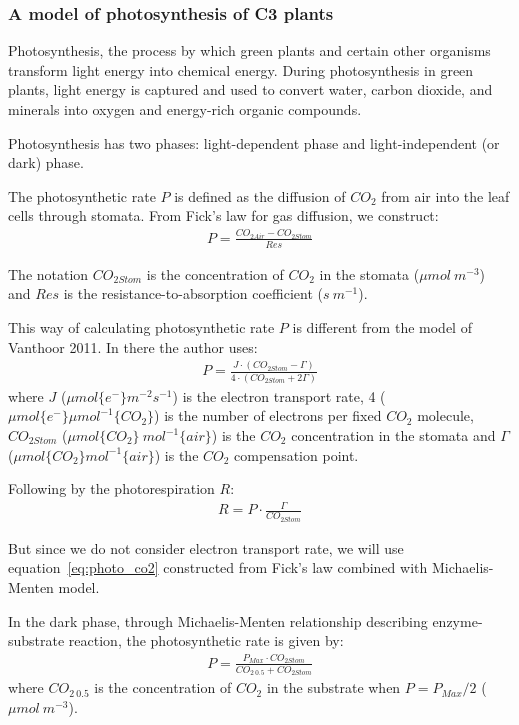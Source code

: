 \documentclass[a4paper]{article}
\numberwithin{equation}{section}
\begin{document}
\subsubsection{A model of photosynthesis of C3 plants}\label{sssec:photo_c3}
Photosynthesis, the process by which green plants and certain other organisms transform light energy into chemical energy. During photosynthesis in green plants, light energy is captured and used to convert water, carbon dioxide, and minerals into oxygen and energy-rich organic compounds.

Photosynthesis has two phases: light-dependent phase and light-independent (or dark) phase.

The photosynthetic rate \( P \) is defined as the diffusion of \( CO_2 \) from air into the leaf cells through stomata. From Fick's law for gas diffusion, we construct:
\begin{align}
  \label{eq:photo_co2}
  P = \frac{CO_{2Air} - CO_{2Stom}}{Res}
\end{align}

The notation \( CO_{2Stom} \) is the concentration of \( CO_2 \) in the stomata (\( \mu mol\ m^{-3} \)) and \( Res \) is the resistance-to-absorption coefficient (\( s\ m^{-1} \)).

This way of calculating photosynthetic rate \( P \) is different from the model of Vanthoor 2011. In there the author uses:
\begin{align}
  P = \frac{J \cdot (CO_{2Stom} - \Gamma)}{4 \cdot (CO_{2Stom} + 2\Gamma)}
\end{align}
where \( J \) (\( \mu mol \{e^-\} m^{-2} s^{-1} \)) is the electron transport rate, 4 (\( \mu mol \{e^-\} \mu mol^{-1} \{CO_2\} \)) is the
number of electrons per fixed \( CO_2 \) molecule, \( CO_{2Stom} \) (\( \mu mol\{CO_2\}\ mol^{-1}\{air\} \)) is the \( CO_2 \) concentration in the stomata and \( \Gamma \) (\( \mu mol \{CO_2\} mol^{-1} \{air\} \)) is the \( CO_2 \) compensation point.

Following by the photorespiration \( R \):
\begin{align}
  R = P \cdot \frac{\Gamma}{CO_{2Stom}}
\end{align}

But since we do not consider electron transport rate, we will use equation~\eqref{eq:photo_co2} constructed from Fick's law combined with Michaelis-Menten model.

In the dark phase, through Michaelis-Menten relationship describing enzyme-substrate reaction, the photosynthetic rate is given by:
\begin{align}
  \label{eq:photo_dark}
  P = \frac{P_{Max} \cdot CO_{2Stom}}{CO_{2\ 0.5} + CO_{2Stom}}
\end{align}
where \( CO_{2\ 0.5} \) is the concentration of \( CO_2 \) in the substrate when \( P = P_{Max}/2 \) (\( \mu mol\ m^{-3} \)).
\end{document}
